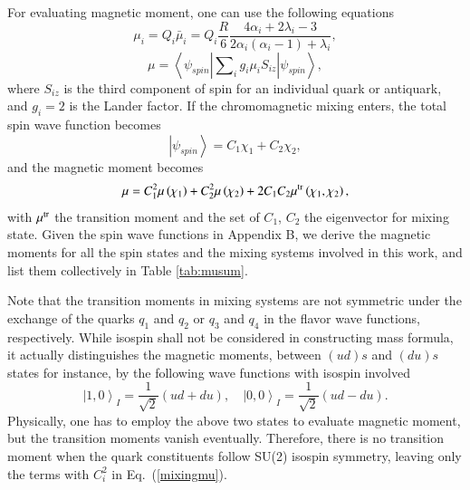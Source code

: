 \documentclass[prd,twocolumn,floatfix,nofootinbib]{revtex4}
\begin{document}
For evaluating magnetic moment, one can use the following equations \cite{DeGrand:1975cf,Wang:2016dzu}
\begin{equation}\label{mui}
    \mu_{i}=Q_{i}\bar{\mu}_{i}=Q_{i}\frac{R}{6} \frac{4\alpha_{i}+2\lambda_{i}-3}{2\alpha_{i}\left(\alpha_{i}-1\right)+\lambda_{i}},
\end{equation}
\begin{equation}\label{musum}
    \mu=\left\langle \psi_{spin} \left| \sum\nolimits_{i}g_{i}\mu_{i}S_{iz} \right| \psi_{spin} \right\rangle,
\end{equation}
where $S_{iz}$ is the third component of spin for an individual quark or antiquark, and $g_{i}=2$ is the Lander factor. 
If the chromomagnetic mixing enters, the total spin wave function becomes
\begin{equation}
    \left| \psi_{spin} \right\rangle=C_{1}\chi_{1}+C_{2}\chi_{2},
\end{equation}
and the magnetic moment becomes
\begin{equation}\label{mixingmu}
    \mu=C_{1}^{2}\mu\left(\chi_{1}\right)+C_{2}^{2}\mu\left(\chi_{2}\right)+2C_{1}C_{2}\mu^{\rm tr}\left(\chi_{1}, \chi_{2}\right),
\end{equation}
with $\mu^{\rm tr}$ the transition moment \cite{Bernotas:2012nz} and the set of $C_{1}$, $C_{2}$ the eigenvector for mixing state.
Given the spin wave functions in Appendix B, we derive the magnetic moments for all the spin states and the mixing systems involved in this work, and list them collectively in Table \ref{tab:musum}.

Note that the transition moments in mixing systems are not symmetric under the exchange of the quarks $q_{1}$ and $q_{2}$ or $q_{3}$ and $q_{4}$ in the flavor wave functions, respectively. 
While isospin shall not be considered in constructing mass formula, it actually distinguishes the magnetic moments, between $\left(ud\right)s$ and $\left(du\right)s$ states for instance,
by the following wave functions with isospin involved
\begin{equation}
    {\left| 1,0\right\rangle}_{I}=\frac{1}{\sqrt{2}} \left(ud+du\right), \quad
    {\left| 0,0\right\rangle}_{I}=\frac{1}{\sqrt{2}} \left(ud-du\right).
\end{equation}
Physically, one has to employ the above two states to evaluate magnetic moment, but the transition moments vanish eventually. 
Therefore, there is no transition moment when the quark constituents follow SU(2) isospin symmetry, leaving only the terms with $C_{i}^{2}$ in Eq.~(\ref{mixingmu}).
\end{document}
